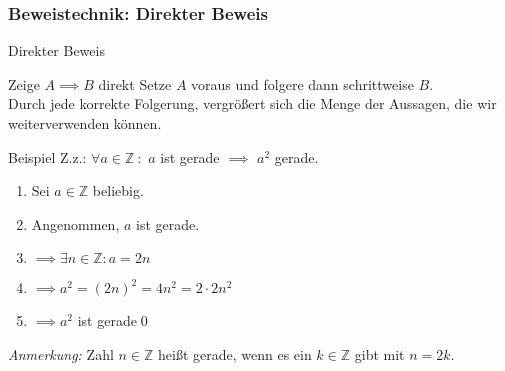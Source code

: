 %
%
%
%

\subsubsection{Beweistechnik: Direkter Beweis}
\begin{frame}[fragile]{Direkter Beweis}
    \begin{alertblock}{Zeige $A\implies B$ direkt}
    Setze $A$ voraus und folgere dann schrittweise $B$.\\
    Durch jede korrekte Folgerung, vergrößert sich die Menge der Aussagen, die wir weiterverwenden können.
    \end{alertblock}
    \begin{exampleblock}{Beispiel}
    Z.z.: \alert<2|handout:0>{$\forall a\in\mathbb{Z}$}$\ :$ \alert<3|handout:0>{$a$ ist gerade} $\implies$ \alert<6|handout:0>{$a^2$ gerade.}
    \begin{enumerate}
        \item \alert<2|handout:0>{Sei $a\in\mathbb{Z}$ beliebig.}
        \item \alert<3|handout:0>{Angenommen, $a$ ist gerade.}
        \item \alert<4|handout:0>{$\implies \exists n\in\mathbb{Z} : a = 2n$}
        \item \alert<5|handout:0>{$\implies a^2 = (2n)^2 = 4n^2 = 2 \cdot 2n^2$}
        \item \alert<6|handout:0>{$\implies a^2$ ist gerade}\qed\;
    \end{enumerate}
    \end{exampleblock}
    \small{\emph{\alert<4|handout:0>{Anmerkung:}} Zahl $n\in\mathbb{Z}$ heißt gerade, wenn es ein $k\in\mathbb{Z}$ gibt mit $n=2k$.}
\end{frame}

